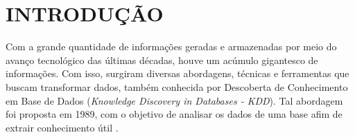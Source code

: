 \documentclass[
	12pt,				%
	openright,			%
	oneside,	
	a4paper,				%
	english,				%
	brazil				%
]{abntex2/abntex2} %
\begin{document}

\tableofcontents*
\cleardoublepage

\textual


\chapter{INTRODUÇÃO}
	Com a grande quantidade de informações geradas e armazenadas por meio do avanço tecnológico das últimas décadas, houve um acúmulo gigantesco de informações. Com isso, surgiram diversas abordagens, técnicas e ferramentas que buscam transformar dados, também conhecida por Descoberta de Conhecimento em Base de Dados (\textit{Knowledge Discovery in Databases - KDD}). Tal abordagem foi proposta em 1989, com o objetivo de analisar os dados de uma base afim de extrair conhecimento útil \cite{fayyad:1996}.	
	
\end{document}
